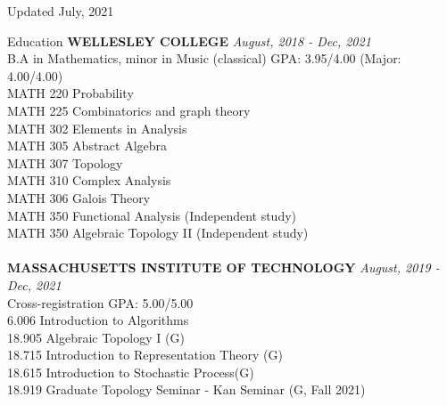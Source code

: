 \documentclass{resume}
\begin{document}
\begin{center}
Updated July, 2021
\end{center} 


\begin{rSection}{Education}
{\bf WELLESLEY COLLEGE} \hfill {\em August, 2018 - Dec, 2021} 
\\ B.A in Mathematics, minor in Music (classical) \hfill { GPA: 3.95/4.00 (Major: 4.00/4.00) }
\\MATH 220 Probability
\\ MATH 225 Combinatorics and graph theory
\\ MATH 302 Elements in Analysis
\\ MATH 305 Abstract Algebra
\\ MATH 307 Topology
\\ MATH 310 Complex Analysis
\\ MATH 306 Galois Theory
\\ MATH 350 Functional Analysis (Independent study)
\\ MATH 350 Algebraic Topology II (Independent study)
\\
\\
{\bf MASSACHUSETTS INSTITUTE OF TECHNOLOGY} \hfill {\em August, 2019 - Dec, 2021} 
\\ Cross-registration\hfill { GPA: 5.00/5.00 }
\\ 6.006 Introduction to Algorithms
\\ 18.905 Algebraic Topology I (G)
\\ 18.715 Introduction to Representation Theory (G)
\\ 18.615 Introduction to Stochastic Process(G)
\\ 18.919 Graduate Topology Seminar - Kan Seminar (G, Fall 2021)\\ 
\end{rSection}
\end{document}
